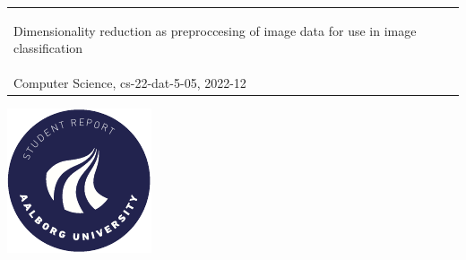 \begin{titlepage}
{{\begin{tabular}{@{}p{\textwidth}@{}}
                \begin{center}
                    \Large{
                        Dimensionality reduction as preproccesing of image data for use in image classification%
                    }
                \end{center}
                \vspace{0.2cm}
                \begin{center}
                    {\Large
                        Daniel Runge Petersen, Gustav Svante Graversen, Lars Emanuel Hansen, Raymond Kacso, Sebastian Aaholm%
                    }\\
                    \vspace{0.2cm}
                    {\large
                        Computer Science, cs-22-dat-5-05, 2022-12%
                    }
                \end{center}
                \vspace{0.2cm}
                \begin{center}
                    {\Large
                        Semester Project
                    }
                \end{center}
            \end{tabular}}}
    \vfill
    \begin{center}
        \includegraphics[width=0.2\paperwidth]{figures/AAUgraphics/aau_logo_circle_en}%
    \end{center}
\end{titlepage}
\clearpage
